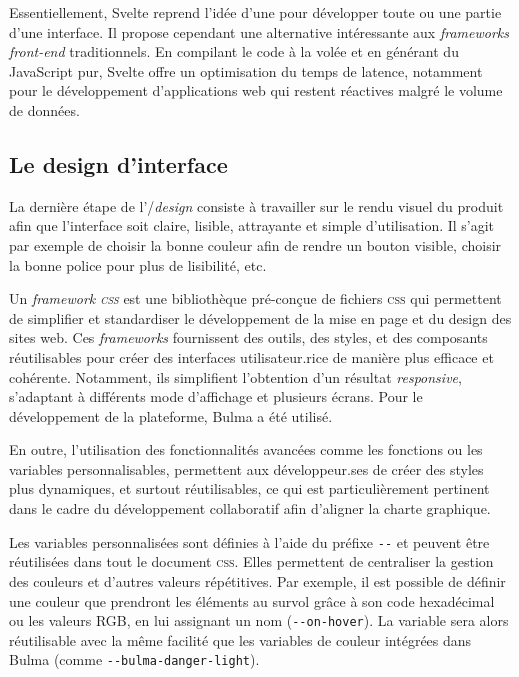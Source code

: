 Essentiellement, Svelte reprend l'idée d'une \spa pour développer toute
ou une partie d'une interface. Il propose cependant une alternative
intéressante aux \textit{frameworks front-end} traditionnels. En compilant le
code à la volée et en générant du JavaScript pur, Svelte offre un
optimisation du temps de latence, notamment pour le développement
d'applications web qui restent réactives malgré le volume de données.

\hypertarget{le-design-dinterface}{%
\subsection{Le design d'interface}\label{le-design-dinterface}}

La dernière étape de l'\ux/\ui \textit{design} consiste à travailler sur le rendu
visuel du produit afin que l'interface soit claire, lisible, attrayante
et simple d'utilisation. Il s'agit par exemple de choisir la bonne
couleur afin de rendre un bouton visible, choisir la bonne police pour
plus de lisibilité, etc. 

Un \textit{framework \textsc{css}} est une bibliothèque pré-conçue de fichiers \textsc{css} qui
permettent de simplifier et standardiser le développement de la mise en
page et du design des sites web. Ces \textit{frameworks} fournissent des outils,
des styles, et des composants réutilisables pour créer des interfaces
utilisateur.rice de manière plus efficace et cohérente. Notamment, ils
simplifient l'obtention d'un résultat \textit{responsive}, s'adaptant à
différents mode d'affichage et plusieurs écrans. Pour le développement
de la plateforme, Bulma a été utilisé.

En outre, l'utilisation des fonctionnalités avancées comme les fonctions
ou les variables personnalisables, permettent aux développeur.ses de créer
des styles plus dynamiques, et surtout réutilisables, ce qui est
particulièrement pertinent dans le cadre du développement collaboratif
afin d'aligner la charte graphique.

Les variables personnalisées sont définies à l'aide du préfixe
\texttt{-\/-} et peuvent être réutilisées dans tout le document \textsc{css}.
Elles permettent de centraliser la gestion des couleurs et d'autres
valeurs répétitives. Par exemple, il est possible de définir une couleur
que prendront les éléments au survol grâce à son code hexadécimal ou les
valeurs RGB, en lui assignant un nom (\texttt{-\/-on-hover}). La
variable sera alors réutilisable avec la même facilité que les variables
de couleur intégrées dans Bulma (comme \texttt{-\/-bulma-danger-light}).

